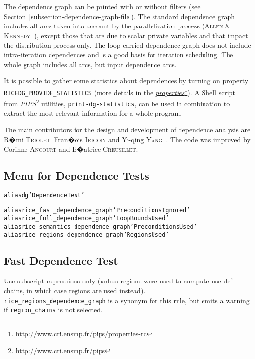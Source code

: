 \documentclass[a4paper]{report}
\newenvironment{PipsMake}{\begin{alltt}}{\end{alltt}}
\newcommand{\LINK}[2]{\href{#2}{#1}\footnote{\url{#2}}\xspace}
\newcommand{\PIPS}{\LINK{\emph{PIPS}}{http://www.cri.ensmp.fr/pips}}
\newcommand{\PROPERTIES}{\LINK{\emph{properties}}{http://www.cri.ensmp.fr/pips/properties-rc}}
\begin{document}
The dependence graph can be printed with or without filters (see
Section~\ref{subsection-dependence-graph-file}). The standard dependence
graph includes all arcs taken into account by the parallelization
process (\textsc{Allen} \& \textsc{Kennedy}~\cite{AK87}), except those that are due to scalar private
variables and that impact the distribution process only. The loop
carried dependence graph does not include intra-iteration dependences
and is a good basis for iteration scheduling. The whole graph includes
all arcs, but input dependence arcs.

It is possible to gather some statistics about dependences by turning
on property \verb/RICEDG_PROVIDE_STATISTICS/ (more details in the
\PROPERTIES{}). A Shell script from \PIPS{} utilities,
\verb/print-dg-statistics/, can be used in combination to extract the
most relevant information for a whole program.

The main contributors for the design and development of dependence
analysis are R�mi \textsc{Triolet}, Fran�ois \textsc{Irigoin} and Yi-qing
\textsc{Yang}~\cite{Y93}. The code was improved by Corinne
\textsc{Ancourt} and B�atrice \textsc{Creusillet}.

\subsection{Menu for Dependence Tests}
\label{subsubsection-menu-for-dependence-tests}

\begin{PipsMake}
alias dg 'Dependence Test'

alias rice_fast_dependence_graph 'Preconditions Ignored'
alias rice_full_dependence_graph 'Loop Bounds Used'
alias rice_semantics_dependence_graph 'Preconditions Used'
alias rice_regions_dependence_graph 'Regions Used'
\end{PipsMake}

\subsection{Fast Dependence Test}
\label{subsubsection-fast-dependence-test}

Use subscript expressions only (unless regions were used to compute
use-def chains, in which case regions are used instead). {\tt
  rice\_regions\_dependence\_graph} is a synonym for this rule, but emits a
warning if {\tt region\_chains} is not selected.
\end{document}
